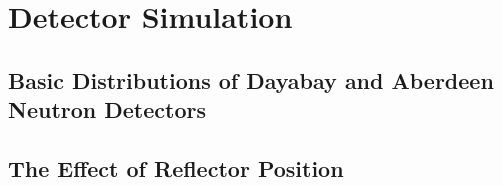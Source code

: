 \chapter {Detector Simulation}

\section {Basic Distributions of Dayabay and Aberdeen Neutron Detectors}

\section {The Effect of Reflector Position}

